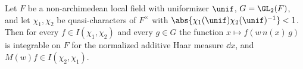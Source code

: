 Let $F$ be a non-archimedean local field with uniformizer $\unif$, $G=\GL_2(F)$, and let $\chi_1,\chi_2$ be
quasi-characters of $F^\times$ with $\abs{\chi_1(\unif)\chi_2(\unif)^{-1}}<1$. Then for every $f\in I(\chi_1,\chi_2)$ and
every $g\in G$ the function $x\mapsto f(w\,n(x)\,g)$ is integrable on $F$ for the normalized additive Haar measure
$\dd x$, and $M(w)f\in I(\chi_2,\chi_1)$.
